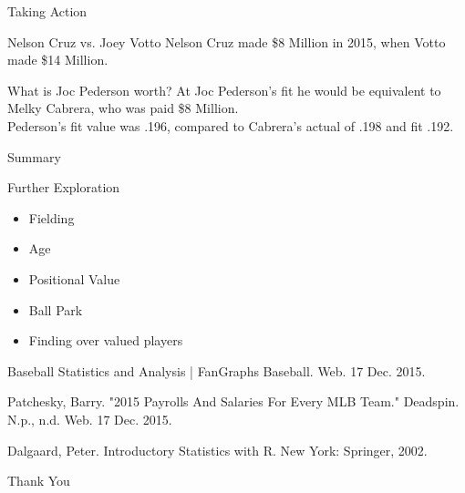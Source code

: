 \documentclass{beamer}
\begin{document}
\begin{frame}{Taking Action}
\begin{block}{Nelson Cruz vs. Joey Votto}
Nelson Cruz made \$8 Million in 2015, when Votto made \$14 Million.
\end{block}
\pause
\begin{block}{What is Joc Pederson worth?}
At Joc Pederson's fit he would be equivalent to Melky Cabrera, who was paid \$8 Million.\\
\pause
Pederson's fit value was .196, compared to Cabrera's actual of .198 and fit .192.
\end{block}

\end{frame}

\begin{frame}{Summary}
\begin{block}{Further Exploration}
\begin{itemize}

\item Fielding
\pause
\item Age
\pause
\item Positional Value
\pause
\item Ball Park
\pause
\item Finding over valued players
\end{itemize}
\end{block}

\end{frame}

\begin{frame}
\begin{thebibliography}{1}

 Baseball Statistics and Analysis | FanGraphs Baseball. Web. 17 Dec. 2015.

 Patchesky, Barry. "2015 Payrolls And Salaries For Every MLB Team." Deadspin. N.p., n.d. Web. 17 Dec. 2015.

Dalgaard, Peter. Introductory Statistics with R. New York: Springer, 2002. 

\end{thebibliography}
\end{frame}

\begin{frame}
\begin{center}
\Huge Thank You
\end{center}
\end{frame}
\end{document}
